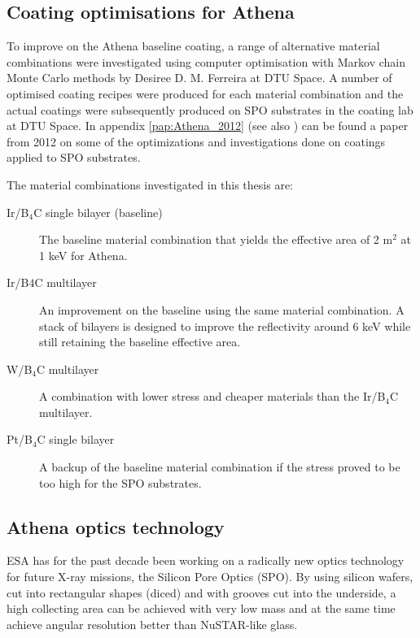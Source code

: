 \subsection{Coating optimisations for Athena}
To improve on the Athena baseline coating, a range of alternative material combinations were investigated using computer optimisation with Markov chain Monte Carlo methods by Desiree D. M. Ferreira at DTU Space. A number of optimised coating recipes were produced for each material combination and the actual coatings were subsequently produced on SPO substrates in the coating lab at DTU Space. In appendix \ref{pap:Athena_2012} (see also \cite{ferreira2012Athena}) can be found a paper from 2012 on some of the optimizations and investigations done on coatings applied to SPO substrates.

The material combinations investigated in this thesis are:

\begin{description}
  \item[Ir/B$_4$C single bilayer (baseline)] The baseline material combination that yields the effective area of 2 m$^2$ at 1 keV for Athena.
  \item[Ir/B$4$C multilayer] An improvement on the baseline using the same material combination. A stack of bilayers is designed to improve the reflectivity around 6 keV while still retaining the baseline effective area.
  \item[W/B$_4$C multilayer] A combination with lower stress and cheaper materials than the Ir/B$_4$C multilayer.
  \item[Pt/B$_4$C single bilayer] A backup of the baseline material combination if the stress proved to be too high for the SPO substrates.
\end{description}

\subsection{Athena optics technology}\label{sec:Athena_opt_tech}
ESA has for the past decade been working on a radically new optics technology for future X-ray missions, the Silicon Pore Optics (SPO)\cite{Barcons:2012va,Collon:2010bp,Collon:2006ky,Collon:2010bp,Collon:2006ky,Beijersbergen:2004cc}. By using silicon wafers, cut into rectangular shapes (diced) and with grooves cut into the underside, a high collecting area can be achieved with very low mass and at the same time achieve angular resolution better than NuSTAR-like glass.

